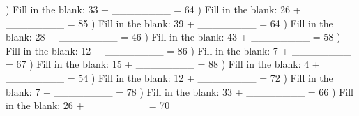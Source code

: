 \documentclass{article}%
\begin{document}
\newline%
\newline%
) Fill in the blank: 33 + \_\_\_\_\_\_\_\_ = 64%
\newline%
\newline%
) Fill in the blank: 26 + \_\_\_\_\_\_\_\_ = 85%
\newline%
\newline%
) Fill in the blank: 39 + \_\_\_\_\_\_\_\_ = 64%
\newline%
\newline%
) Fill in the blank: 28 + \_\_\_\_\_\_\_\_ = 46%
\newline%
\newline%
) Fill in the blank: 43 + \_\_\_\_\_\_\_\_ = 58%
\newline%
\newline%
) Fill in the blank: 12 + \_\_\_\_\_\_\_\_ = 86%
\newline%
\newline%
) Fill in the blank: 7 + \_\_\_\_\_\_\_\_ = 67%
\newline%
\newline%
) Fill in the blank: 15 + \_\_\_\_\_\_\_\_ = 88%
\newline%
\newline%
) Fill in the blank: 4 + \_\_\_\_\_\_\_\_ = 54%
\newline%
\newline%
) Fill in the blank: 12 + \_\_\_\_\_\_\_\_ = 72%
\newline%
\newline%
) Fill in the blank: 7 + \_\_\_\_\_\_\_\_ = 78%
\newline%
\newline%
) Fill in the blank: 33 + \_\_\_\_\_\_\_\_ = 66%
\newline%
\newline%
) Fill in the blank: 26 + \_\_\_\_\_\_\_\_ = 70%
\end{document}
